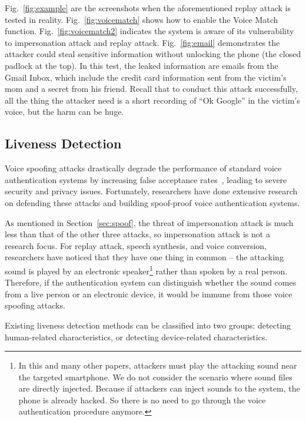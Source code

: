 Fig.~\ref{fig:example} are the screenshots when the aforementioned replay attack is tested in reality. Fig.~\ref{fig:voicematch} shows how to enable the Voice Match function. Fig.~\ref{fig:voicematch2} indicates the system is aware of its vulnerability to impersonation attack and replay attack. Fig.~\ref{fig:email} demonstrates the attacker could steal sensitive information without unlocking the phone (the closed padlock at the top). In this test, the leaked information are emails from the Gmail Inbox, which include the credit card information sent from the victim's mom and a secret from his friend. Recall that to conduct this attack successfully, all the thing the attacker need is a short recording of ``Ok Google'' in the victim's voice, but the harm can be huge.


\subsection{Liveness Detection}
Voice spoofing attacks drastically degrade the performance of standard voice authentication systems by increasing false acceptance rates~\cite{wang2011channel, ergunay2015vulnerability}, leading to severe security and privacy issues. Fortunately, researchers have done extensive research on defending these attacks and building spoof-proof voice authentication systems.






As mentioned in Section~\ref{sec:spoof}, the threat of impersonation attack is much less than that of the other three attacks, so impersonation attack is not a research focus. For replay attack, speech synthesis, and voice conversion, researchers have noticed that they have one thing in common -- the attacking sound is played by an electronic speaker\footnote{In this and many other papers, attackers must play the attacking sound near the targeted smartphone. We do not consider the scenario where sound files are directly injected. Because if attackers can inject sounds to the system, the phone is already hacked. So there is no need to go through the voice authentication procedure anymore.} rather than spoken by a real person. Therefore, if the authentication system can distinguish whether the sound comes from a live person or an electronic device, it would be immune from those voice spoofing attacks.



Existing liveness detection methods can be classified into two groups: detecting human-related characteristics, or detecting device-related characteristics. 

